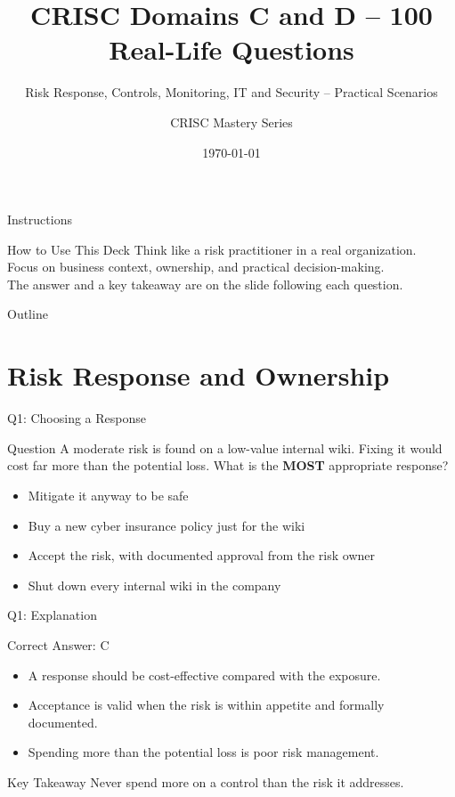 \documentclass[aspectratio=169]{beamer}
\title{CRISC Domains C and D -- 100 Real-Life Questions}
\subtitle{Risk Response, Controls, Monitoring, IT and Security -- Practical Scenarios}
\author{CRISC Mastery Series}
\date{\today}
\newcommand{\hq}[7]{%
	\begin{frame}{Q#1: #2}
		\begin{block}{Question}
			#3
		\end{block}
		\begin{itemize}
			#4
		\end{itemize}
	\end{frame}
	\begin{frame}{Q#1: Explanation}
		\begin{block}{Correct Answer: #5}
			\begin{itemize}
				#6
			\end{itemize}
		\end{block}
		\begin{alertblock}{Key Takeaway}
			#7
		\end{alertblock}
	\end{frame}
}
\begin{document}
	
	\begin{frame}
		\titlepage
	\end{frame}
	
	\begin{frame}{Instructions}
		\begin{alertblock}{How to Use This Deck}
			Think like a risk practitioner in a real organization.\\
			Focus on business context, ownership, and practical decision-making.\\
			The answer and a key takeaway are on the slide following each question.
		\end{alertblock}
	\end{frame}
	
	\begin{frame}{Outline}
		\tableofcontents
	\end{frame}
	
	\section{Risk Response and Ownership}
	
	\hq{1}{Choosing a Response}
	{A moderate risk is found on a low-value internal wiki. Fixing it would cost far more than the potential loss. What is the \textbf{MOST} appropriate response?}
	{\item[\textbf{(A)}] Mitigate it anyway to be safe
		\item[\textbf{(B)}] Buy a new cyber insurance policy just for the wiki
		\item[\textbf{(C)}] Accept the risk, with documented approval from the risk owner
		\item[\textbf{(D)}] Shut down every internal wiki in the company}
	{C}
	{\item A response should be cost-effective compared with the exposure.
		\item Acceptance is valid when the risk is within appetite and formally documented.
		\item Spending more than the potential loss is poor risk management.}
	{Never spend more on a control than the risk it addresses.}
	
\end{document}
